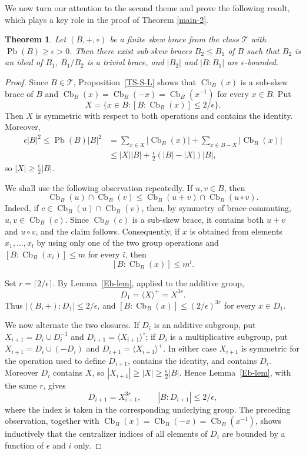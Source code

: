 \documentclass[10pt,a4paper]{amsart}
\numberwithin{equation}{section}
\newtheorem{thm}[equation]{Theorem}
\newcommand{\Cb}{\operatorname{Cb} }
\newcommand{\Pb}{\operatorname{Pb} }
\begin{document}
We now turn our attention to the second theme and prove the following result, which plays a key role in the proof of Theorem \ref{main-2}.  
\begin{thm}\label{maintheorem}
    Let $(B,+,\circ)$ be a finite skew brace from the class $\mathcal{T}$ with $\Pb(B)\geqslant \epsilon > 0$. Then there exist sub-skew braces $B_2 \leqslant B_1$ of  $B$ such that $B_2$ is an ideal of $B_1$, $B_1/B_2$ is a trivial brace, and $|B_2|$ and $|B:B_1|$ are $\epsilon$-bounded.
\end{thm}
\begin{proof}
Since $B\in\mathcal T$, Proposition~\ref{TS-S-L} shows that $\Cb_B(x)$ is a sub-skew brace of $B$ and
$\Cb_B(x)=\Cb_B(-x)=\Cb_B(x^{-1})$ for every $x\in B$. Put
$$
X=\{x\in B:[B:\Cb_B(x)]\leqslant 2/\epsilon\}.
$$
Then $X$ is symmetric with respect to both operations and contains the identity. Moreover,
\begin{align*}
\epsilon|B|^2\leqslant \Pb(B)|B|^2
&=\sum_{x\in X}|\Cb_B(x)|+\sum_{x\in B-X}|\Cb_B(x)|\\
&\leqslant |X||B|+\frac{\epsilon}{2}(|B|-|X|)|B|,
\end{align*}
so $|X|\geqslant \frac{\epsilon}{2}|B|$.

We shall use the following observation repeatedly. If $u,v\in B$, then
$$
\Cb_B(u)\cap\Cb_B(v)\leqslant \Cb_B(u+v)\cap\Cb_B(u\circ v).
$$
Indeed, if $c\in\Cb_B(u)\cap\Cb_B(v)$, then, by symmetry of brace-commuting, $u,v\in\Cb_B(c)$. Since $\Cb_B(c)$ is a sub-skew brace, it contains both $u+v$ and $u\circ v$, and the claim follows. Consequently, if $x$ is obtained from elements $x_1,\ldots,x_l$ by using only one of the two group operations and $[B:\Cb_B(x_i)]\leqslant m$ for every $i$, then
$$
[B:\Cb_B(x)]\leqslant m^l.
$$

Set $r=\lceil2/\epsilon\rceil$. By Lemma~\ref{Eb-lem}, applied to the additive group,
$$
D_1=\langle X\rangle^+=X^{3r}.
$$
Thus $|(B,+):D_1|\leqslant 2/\epsilon$, and
$[B:\Cb_B(x)]\leqslant(2/\epsilon)^{3r}$ for every $x\in D_1$.

We now alternate the two closures. If $D_i$ is an additive subgroup, put
$X_{i+1}=D_i\cup D_i^{-1}$ and $D_{i+1}=\langle X_{i+1}\rangle^\circ$; if $D_i$ is a multiplicative subgroup, put
$X_{i+1}=D_i\cup(-D_i)$ and $D_{i+1}=\langle X_{i+1}\rangle^+$. In either case $X_{i+1}$ is symmetric for the operation used to define $D_{i+1}$, contains the identity, and contains $D_i$. Moreover $D_i$ contains $X$, so
$|X_{i+1}|\geqslant|X|\geqslant\frac{\epsilon}{2}|B|$. Hence Lemma~\ref{Eb-lem}, with the same $r$, gives
$$
D_{i+1}=X_{i+1}^{3r},
\qquad
|B:D_{i+1}|\leqslant 2/\epsilon,
$$
where the index is taken in the corresponding underlying group. The preceding observation, together with
$\Cb_B(x)=\Cb_B(-x)=\Cb_B(x^{-1})$, shows inductively that the centralizer indices of all elements of $D_i$ are bounded by a function of $\epsilon$ and $i$ only.


\end{proof}
\end{document}
